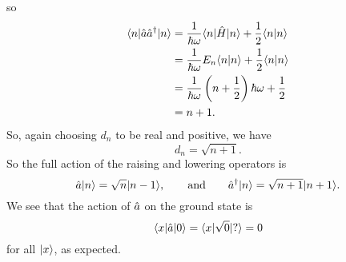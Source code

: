     so
    \begin{align*}
        \langle {n} \vert\hat{a}\hat{a}^\dagger\vert {n} \rangle &= \frac{1}{\hbar\omega}\langle {n} \vert\hat{H}\vert {n} \rangle + \frac{1}{2}\langle {n} \vert {n} \rangle\\
        &= \frac{1}{\hbar\omega}E_n\langle {n} \vert {n} \rangle + \frac{1}{2}\langle {n} \vert {n} \rangle\\
        &= \frac{1}{\hbar\omega}\left(n + \frac{1}{2}\right)\hbar\omega + \frac{1}{2}\\
        &= n + 1.
    \end{align*}
    So, again choosing \(d_n\) to be real and positive, we have
    \[d_n = \sqrt{n + 1}.\]
    So the full action of the raising and lowering operators is
    \[\hat{a}\vert {n} \rangle = \sqrt{n}\vert {n - 1} \rangle,\qquad\text{and}\qquad \hat{a}^\dagger\vert {n} \rangle = \sqrt{n + 1}\vert {n + 1} \rangle.\]
    We see that the action of \(\hat{a}\) on the ground state is
    \[\langle {x} \vert\hat{a}\vert {0} \rangle = \langle {x} \vert\sqrt{0}\vert {?} \rangle = 0\]
    for all \(\vert {x} \rangle\), as expected.
    
